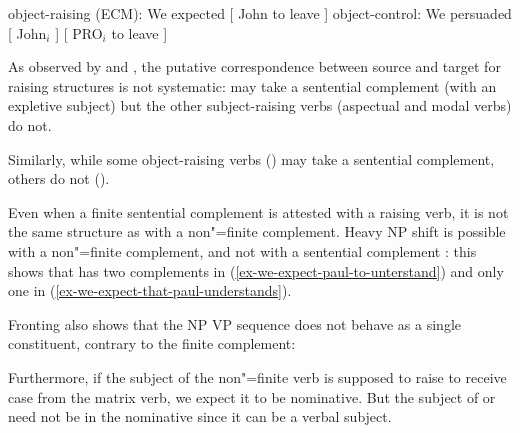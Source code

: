 \documentclass[output=paper
                ,modfonts
                ,nonflat
	        ,collection
	        ,collectionchapter
	        ,collectiontoclongg
 	        ,biblatex
                ,babelshorthands
                ,newtxmath
                ,draftmode
                ,colorlinks, citecolor=brown
]{./langsci/langscibook}
\begin{document}
\begin{exe}
\ex  \begin{xlist}
\ex 	object-raising (ECM): We expected [ John to leave ] 	
\ex object-control: We persuaded  
{}[ John$_{i}$ ]  [ PRO$_{i}$ to leave ]	
 \end{xlist}
 \end{exe}

 As observed by \citet{Bresnan1982} and \citet{SagandPollard1991}, the putative correspondence between source and target for raising structures is not systematic:  may take a sentential complement (with an expletive subject) but the other subject-raising verbs (aspectual and modal verbs) do not. 


\eal
{}
\zl
\eal
{}
\zl
 
 Similarly, while some object-raising verbs () may take a sentential complement, others do not ().
 
\eal
{}
\zl
\eal
{}
\zl

Even when a finite sentential complement is attested with a raising verb, it is not the same structure as  with a non"=finite complement. Heavy NP shift is possible with a non"=finite complement, and not with a sentential complement \citet{Bresnan1982}: this shows that  has two complements in (\ref{ex-we-expect-paul-to-unterstand}) and only one in (\ref{ex-we-expect-that-paul-understands}).

\eal
{}
\zl

Fronting also shows that the NP VP sequence does not behave as a single constituent, contrary to the finite complement:

\eal
{}
\zl


 Furthermore, if the subject of the non"=finite verb is supposed to raise to receive case from the matrix verb, we expect it to be nominative. 
 But the subject of  or  need not be in the nominative since it can be a verbal subject.
 
\end{document}
